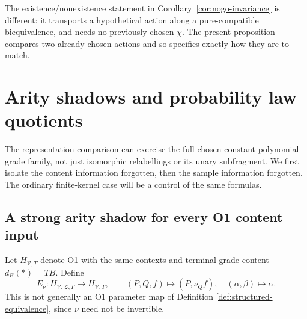 \documentclass[11pt,a4paper]{article}
\theoremstyle{definition}
\newcommand{\V}{\mathcal V}
\newcommand{\Lcat}{\mathcal L}
\begin{document}
The existence/nonexistence statement in Corollary~\ref{cor:nogo-invariance}
is different: it transports a hypothetical action along a pure-compatible
biequivalence, and needs no previously chosen $\chi$. The present proposition
compares two already chosen actions and so specifies exactly how they are
to match.

\section{Arity shadows and probability law quotients}\label{sec:probability}

The representation comparison can exercise the full chosen constant
polynomial grade family, not just isomorphic relabellings or its unary
subfragment. We first isolate the content information forgotten, then the
sample information forgotten. The ordinary finite-kernel case will be a
control of the same formulas.

\subsection{A strong arity shadow for every O1 content input}
Let $H_{\V,T}$ denote O1 with the same contexts and terminal-grade content
$d_B(*)=TB$. Define
\begin{equation}\label{eq:arity-shadow}
 E_\nu:H_{\V,\Lcat,T}\longrightarrow H_{\V,T},\qquad
 (P,Q,f)\longmapsto(P,\nu_Qf),\quad(\alpha,\beta)\longmapsto\alpha.
\end{equation}
This is not generally an O1 parameter map of Definition
\ref{def:structured-equivalence}, since $\nu$ need not be invertible.
\end{document}
